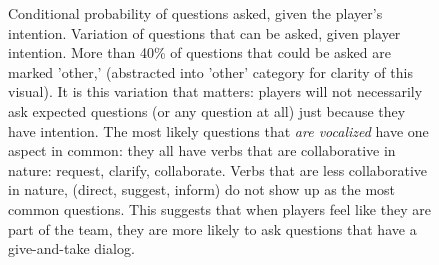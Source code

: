 \begin{figure}[h!]
    \centering
    \caption{%
        Conditional probability of questions asked, given the player's
        intention. Variation of questions that can be asked, given player
        intention. More than 40\% of questions that could be asked are marked
        'other,' (abstracted into 'other' category for clarity of this visual).
        It is this variation that matters: players will not necessarily ask
        expected questions (or any question at all) just because they have
        intention. The most likely questions that \emph{are vocalized} have one
        aspect in common: they all have verbs that are collaborative in nature:
        request, clarify, collaborate. Verbs that are less collaborative in
        nature, (direct, suggest, inform) do not show up as the most common
        questions. This suggests that when players feel like they are part of
        the team, they are more likely to ask questions that have a
        give-and-take dialog.
    }
\end{figure}

